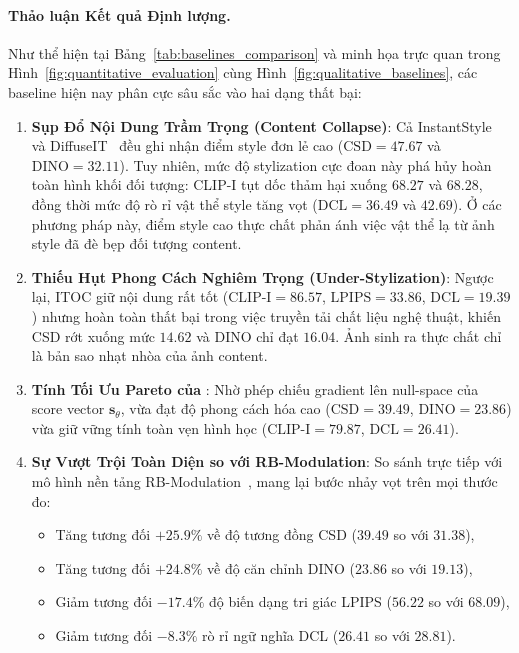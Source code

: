 \documentclass[runningheads]{llncs}
\begin{document}
\paragraph{Thảo luận Kết quả Định lượng.}
Như thể hiện tại Bảng~\ref{tab:baselines_comparison} và minh họa trực quan trong Hình~\ref{fig:quantitative_evaluation} cùng Hình~\ref{fig:qualitative_baselines}, các baseline hiện nay phân cực sâu sắc vào hai dạng thất bại:
\begin{enumerate}
    \item \textbf{Sụp Đổ Nội Dung Trầm Trọng (Content Collapse)}: Cả InstantStyle~\cite{instantstyle} và DiffuseIT~\cite{diffuseIT} đều ghi nhận điểm style đơn lẻ cao ($\text{CSD} = 47.67$ và $\text{DINO} = 32.11$). Tuy nhiên, mức độ stylization cực đoan này phá hủy hoàn toàn hình khối đối tượng: CLIP-I tụt dốc thảm hại xuống $68.27$ và $68.28$, đồng thời mức độ rò rỉ vật thể style tăng vọt ($\text{DCL} = 36.49$ và $42.69$). Ở các phương pháp này, điểm style cao thực chất phản ánh việc vật thể lạ từ ảnh style đã đè bẹp đối tượng content.
    \item \textbf{Thiếu Hụt Phong Cách Nghiêm Trọng (Under-Stylization)}: Ngược lại, ITOC giữ nội dung rất tốt ($\text{CLIP-I} = 86.57$, $\text{LPIPS} = 33.86$, $\text{DCL} = 19.39$) nhưng hoàn toàn thất bại trong việc truyền tải chất liệu nghệ thuật, khiến CSD rớt xuống mức $14.62$ và DINO chỉ đạt $16.04$. Ảnh sinh ra thực chất chỉ là bản sao nhạt nhòa của ảnh content.
    \item \textbf{Tính Tối Ưu Pareto của \method}: Nhờ phép chiếu gradient lên null-space của score vector $\mathbf{s}_\theta$, \method vừa đạt độ phong cách hóa cao ($\text{CSD} = 39.49$, $\text{DINO} = 23.86$) vừa giữ vững tính toàn vẹn hình học ($\text{CLIP-I} = 79.87$, $\text{DCL} = 26.41$).
    \item \textbf{Sự Vượt Trội Toàn Diện so với RB-Modulation}: So sánh trực tiếp với mô hình nền tảng RB-Modulation~\cite{rout2025rbmodulation}, \method mang lại bước nhảy vọt trên mọi thước đo:
    \begin{itemize}
        \item Tăng tương đối $+25.9\%$ về độ tương đồng CSD ($39.49$ so với $31.38$),
        \item Tăng tương đối $+24.8\%$ về độ căn chỉnh DINO ($23.86$ so với $19.13$),
        \item Giảm tương đối $-17.4\%$ độ biến dạng tri giác LPIPS ($56.22$ so với $68.09$),
        \item Giảm tương đối $-8.3\%$ rò rỉ ngữ nghĩa DCL ($26.41$ so với $28.81$).
    \end{itemize}
\end{enumerate}
\end{document}
